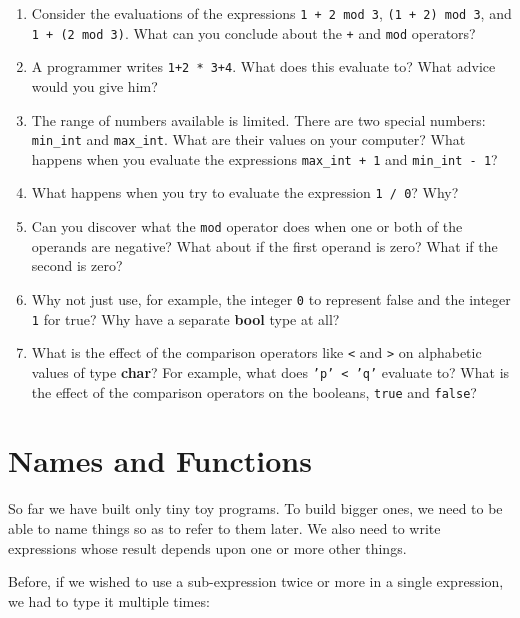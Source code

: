 \documentclass[]{book}
\begin{document}
\begin{enumerate}
\item Consider the evaluations of the expressions \texttt{1 + 2 mod 3}, \texttt{(1 + 2) mod 3}, and \texttt{1 + (2 mod 3)}. What can you conclude about the \texttt{+} and \texttt{mod} operators?
\item A programmer writes \texttt{1+2 * 3+4}. What does this evaluate to? What advice would you give him?
\item {\begin{sloppypar}The range of numbers available is limited. There are two special numbers: \texttt{min\_int} and \texttt{max\_int}. What are their values on your computer? What happens when you evaluate the expressions \texttt{max\_int + 1} and \texttt{min\_int - 1}?\end{sloppypar}}
\item What happens when you try to evaluate the expression \texttt{1 / 0}? Why?
\item Can you discover what the \texttt{mod} operator does when one or both of the operands are negative? What about if the first operand is zero? What if the second is zero?
\item Why not just use, for example, the integer \texttt{0} to represent false and the integer \texttt{1} for true? Why have a separate \textbf{\textsf{bool}} type at all?
\item What is the effect of the comparison operators like \texttt{<} and \texttt{>} on alphabetic values of type \textbf{\textsf{char}}? For example, what does \texttt{'p' < 'q'} evaluate to? What is the effect of the comparison operators on the booleans, \texttt{true} and \texttt{false}?
\end{enumerate}

\cleardoublepage

\thispagestyle{empty}

\chapter{Names and Functions}

So far we have built only tiny toy programs. To build bigger ones, we need to be able to name things so as to refer to them later. We also need to write expressions whose result depends upon one or more other things.

Before, if we wished to use a sub-expression twice or more in a single expression, we had to type it multiple times:
\end{document}
